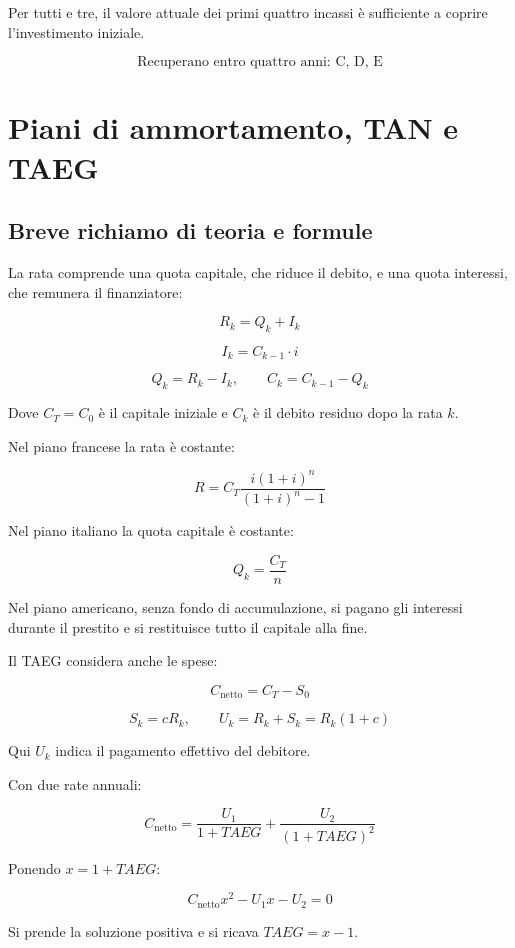 \noindent Per tutti e tre, il valore attuale dei primi quattro incassi
è sufficiente a coprire l'investimento iniziale.

\[
    \boxed{\text{Recuperano entro quattro anni: C, D, E}}
\]


\section{Piani di ammortamento, TAN e TAEG}

\subsection*{Breve richiamo di teoria e formule}

\noindent La rata comprende una quota capitale, che riduce il debito,
e una quota interessi, che remunera il finanziatore:

\[
    R_k=Q_k+I_k
\]

\[
    I_k=C_{k-1}\cdot i
\]

\[
    Q_k=R_k-I_k,
    \qquad
    C_k=C_{k-1}-Q_k
\]

\noindent Dove $C_T=C_0$ è il capitale iniziale e $C_k$
è il debito residuo dopo la rata $k$.

\noindent Nel piano francese la rata è costante:

\[
    R=C_T\frac{i(1+i)^n}{(1+i)^n-1}
\]

\noindent Nel piano italiano la quota capitale è costante:

\[
    Q_k=\frac{C_T}{n}
\]

\noindent Nel piano americano, senza fondo di accumulazione,
si pagano gli interessi durante il prestito
e si restituisce tutto il capitale alla fine.

\noindent Il TAEG considera anche le spese:

\[
    C_{\text{netto}}=C_T-S_0
\]

\[
    S_k=cR_k,
    \qquad
    U_k=R_k+S_k=R_k(1+c)
\]

\noindent Qui $U_k$ indica il pagamento effettivo del debitore.

\noindent Con due rate annuali:

\[
    C_{\text{netto}}
    =
    \frac{U_1}{1+TAEG}
    +
    \frac{U_2}{(1+TAEG)^2}
\]

\noindent Ponendo $x=1+TAEG$:

\[
    C_{\text{netto}}x^2-U_1x-U_2=0
\]

\noindent Si prende la soluzione positiva e si ricava $TAEG=x-1$.

